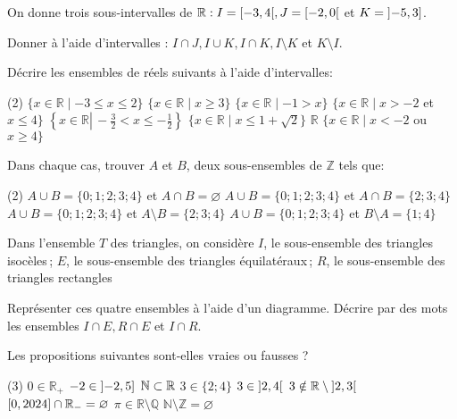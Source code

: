 \documentclass[a4paper,12pt]{report}
\begin{document}
\begin{exo}
	On donne trois sous-intervalles de $\mathbb{R}: I=\interval[open right]{-3}{4}, J=\interval[open right]{-2}{0}$ et $K=\interval[open left]{-5}{3}$.

Donner à l'aide d'intervalles : $I \cap J, I \cup K, I \cap K, I \setminus K$ et $K \setminus I$.
\end{exo}
\begin{exo}
Décrire les ensembles de réels suivants à l'aide d'intervalles:
\begin{tasks}(2)
\task $\{x \in \mathbb{R} \mid-3 \leq x \leq 2\}$
\task $\{x \in \mathbb{R} \mid x \geq 3\}$
\task $\{x \in \mathbb{R} \mid-1>x\}$
\task $\{x \in \mathbb{R} \mid x>-2$ et $x \leq 4\}$
\task $\left\{x \in \mathbb{R} \left\lvert\,-\frac{3}{2}<x \leq-\frac{1}{2}\right.\right\}$
\task $\{x \in \mathbb{R} \mid x \leq 1+\sqrt{2}\}$
\task $\mathbb{R}$
\task $\{x \in \mathbb{R} \mid x<-2$ ou $x \geq 4\}$
\end{tasks}
\end{exo}
\begin{exo}
Dans chaque cas, trouver $A$ et $B$, deux sous-ensembles de $\mathbb{Z}$ tels que:
\begin{tasks}(2)
\task $A \cup B=\{0 ; 1 ; 2 ; 3 ; 4\}$ et $A \cap B=\varnothing$
\task $A \cup B=\{0 ; 1 ; 2 ; 3 ; 4\}$ et $A \cap B=\{2 ; 3 ; 4\}$
\task $A \cup B=\{0 ; 1 ; 2 ; 3 ; 4\}$ et $A \setminus B=\{2 ; 3 ; 4\}$
\task $A \cup B=\{0 ; 1 ; 2 ; 3 ; 4\}$ et $B \setminus A=\{1 ; 4\}$
\end{tasks}
\end{exo}
\begin{exo}
Dans l'ensemble $T$ des triangles, on considère $I$, le sous-ensemble des triangles isocèles\,; $E$, le sous-ensemble des triangles équilatéraux\,; $R$, le sous-ensemble des triangles rectangles
\begin{tasks}
\task Représenter ces quatre ensembles à l'aide d'un diagramme.
\task Décrire par des mots les ensembles $I \cap E, R \cap E$ et $I \cap R$.
\end{tasks}
\end{exo}

\begin{exo}
Les propositions suivantes sont-elles vraies ou fausses ?
\begin{tasks}(3)
\task $0 \in \mathbb{R}_{+}$
\task $-2 \in\interval[open left]{-2}{5}$
\task $\mathbb N \subset \mathbb{R}$
\task $3 \in\{2 ; 4\}$
\task $3 \in\interval[open]{2}{4}$
\task $3 \notin \mathbb{R} \setminus\interval[open]{2}{3}$
\task $\interval{0}{2024} \cap \mathbb{R}_{-}=\varnothing$
\task $\pi \in \mathbb{R} \setminus \mathbb{Q}$
\task $\mathbb{N} \setminus \mathbb{Z}=\varnothing$
\end{tasks}
\end{exo}
\end{document}
